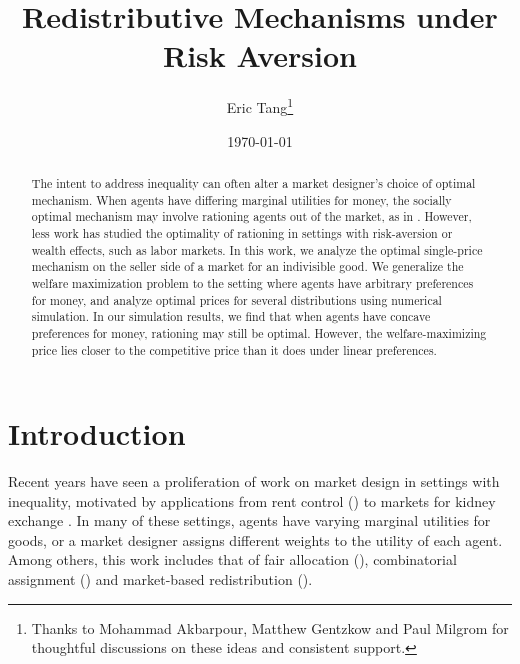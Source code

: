 \documentclass[AER]{AEA}
\begin{document}
\title{Redistributive Mechanisms under Risk Aversion}
\author{Eric Tang\thanks{%
Thanks to Mohammad Akbarpour, Matthew Gentzkow and Paul Milgrom for thoughtful discussions on these ideas and consistent support.}}
\date{\today}
\pubVolume{}
\pubIssue{}
\JEL{}
\Keywords{}

\begin{abstract}
    The intent to address inequality can often alter a market designer's choice of optimal mechanism. When agents have differing marginal utilities for money, the socially optimal mechanism may involve rationing agents out of the market, as in \cite{dworczak-2020}. However, less work has studied the optimality of rationing in settings with risk-aversion or wealth effects, such as labor markets. In this work, we analyze the optimal single-price mechanism on the seller side of a market for an indivisible good. We generalize the welfare maximization problem to the setting where agents have arbitrary preferences for money, and analyze optimal prices for several distributions using numerical simulation. In our simulation results, we find that when agents have concave preferences for money, rationing may still be optimal. However, the welfare-maximizing price lies closer to the competitive price than it does under linear preferences.
\end{abstract}

\maketitle

\section{Introduction}


Recent years have seen a proliferation of work on market design in settings with inequality, motivated by applications from rent control (\cite{diamond-2019}) to markets for kidney exchange \cite{dworczak-2020}. In many of these settings, agents have varying marginal utilities for goods, or a market designer assigns different weights to the utility of each agent. Among others, this work includes that of fair allocation (\cite{babaioff-2019}), combinatorial assignment (\cite{budish-2011}) and market-based redistribution (\cite{akbarpour-2020}).
\end{document}
